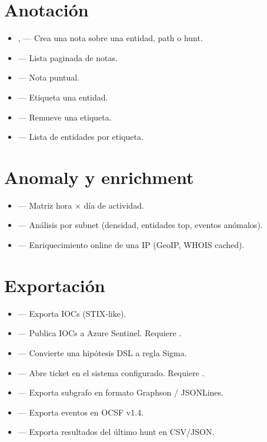 \section{Anotación}

\begin{itemize}
    \item {},  — Crea una nota
    sobre una entidad, path o hunt.
    \item {} — Lista paginada de notas.
    \item {} — Nota puntual.
    \item {} — Etiqueta una entidad.
    \item {} — Remueve una etiqueta.
    \item {} — Lista de entidades por etiqueta.
\end{itemize}

\section{Anomaly y enrichment}

\begin{itemize}
    \item {} — Matriz hora $\times$ día de
    actividad.
    \item {} — Análisis por subnet
    (densidad, entidades top, eventos anómalos).
    \item {} — Enriquecimiento online de una IP
    (GeoIP, WHOIS cached).
\end{itemize}

\section{Exportación}

\begin{itemize}
    \item {} — Exporta IOCs (STIX-like).
    \item {} — Publica IOCs a
    Azure Sentinel. Requiere .
    \item {} — Convierte una
    hipótesis DSL a regla Sigma.
    \item {} — Abre ticket en el sistema
    configurado. Requiere .
    \item {} — Exporta subgrafo en formato
    Graphson / JSONLines.
    \item {} — Exporta eventos en OCSF v1.4.
    \item {} — Exporta resultados del
    último hunt en CSV/JSON.
\end{itemize}


